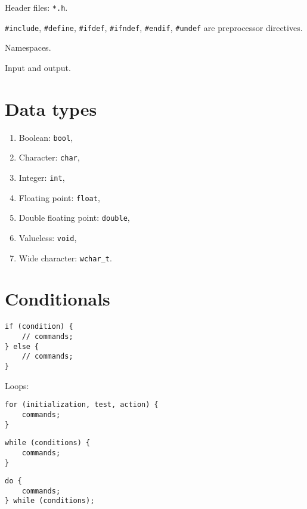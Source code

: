 \documentclass{programmingnotes}
\begin{document}
\renewcommand{\footrulewidth}{0.4pt}
\begin{multicols*}{3}

Header files: \texttt{*.h}.

\texttt{#include}, \texttt{#define}, \texttt{#ifdef}, \texttt{#ifndef}, \texttt{#endif}, \texttt{#undef} are preprocessor directives.

Namespaces.

Input and output.

\section{Data types}
\begin{enumerate}
\item Boolean: \texttt{bool}, 
\item Character: \texttt{char}, 
\item Integer: \texttt{int}, 
\item Floating point: \texttt{float}, 
\item Double floating point: \texttt{double}, 
\item Valueless: \texttt{void}, 
\item Wide character: \texttt{wchar\_t}.
\end{enumerate}

\section{Conditionals}

\begin{verbatim}
if (condition) {
	// commands;
} else {
	// commands;
}
\end{verbatim}
Loops:

\begin{verbatim}
for (initialization, test, action) {
	commands;
}
\end{verbatim}

\begin{verbatim}
while (conditions) {
	commands;
}
\end{verbatim}

\begin{verbatim}
do {
	commands;
} while (conditions);
\end{verbatim}

\end{multicols*}
\end{document}
